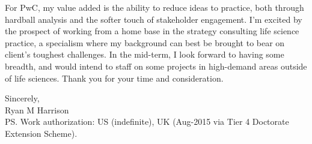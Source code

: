 \documentclass[a4paper]{../res}
\begin{document}
\begin{sloppypar}
\begin{resume}
For PwC, my value added is the ability to reduce ideas to practice, both through hardball analysis and the softer touch of stakeholder engagement. I'm excited by the prospect of working from a home base in the strategy consulting life science practice, a specialism where my background can best be brought to bear on client's toughest challenges. In the mid-term, I look forward to having some breadth, and would intend to staff on some projects in high-demand areas outside of life sciences. Thank you for your time and consideration.

Sincerely, \\
Ryan M Harrison \\
PS. Work authorization: US (indefinite), UK (Aug-2015 via Tier 4 Doctorate Extension Scheme). 


\end{resume} 
\end{sloppypar}
\end{document}

